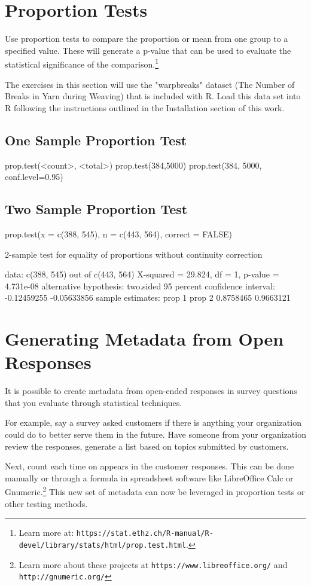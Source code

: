 \section{Proportion Tests}
Use proportion tests to compare the proportion or mean from one group to a specified value. These will generate a p-value that can be used to evaluate the statistical significance of the comparison.\footnote{Learn more at: \texttt{https://stat.ethz.ch/R-manual/R-devel/library/stats/html/prop.test.html}.}

The exercises in this section will use the "warpbreaks" dataset (The Number of Breaks in Yarn during Weaving) that is included with R. Load this data set into R following the instructions outlined in the Installation section of this work.

\subsection{One Sample Proportion Test}
prop.test(<count>, <total>)
prop.test(384,5000)
prop.test(384, 5000, conf.level=0.95)

\subsection{Two Sample Proportion Test}
prop.test(x = c(388, 545), n = c(443, 564), correct = FALSE)

2-sample test for equality of proportions without continuity
        correction

data:  c(388, 545) out of c(443, 564)
X-squared = 29.824, df = 1, p-value = 4.731e-08
alternative hypothesis: two.sided
95 percent confidence interval:
 -0.12459255 -0.05633856
sample estimates:
   prop 1    prop 2 
0.8758465 0.9663121 

\section{Generating Metadata from Open Responses}
It is possible to create metadata from open-ended responses in survey questions that you evaluate through statistical techniques.

For example, say a survey asked customers if there is anything your organization could do to better serve them in the future. Have someone from your organization review the responses, generate a list based on topics submitted by customers. 

Next, count each time on appears in the customer responses. This can be done manually or through a formula in spreadsheet software like LibreOffice Calc or Gnumeric.\footnote{Learn more about these projects at \texttt{https://www.libreoffice.org/} and \texttt{http://gnumeric.org/}} This new set of metadata can now be leveraged in proportion tests or other testing methods.